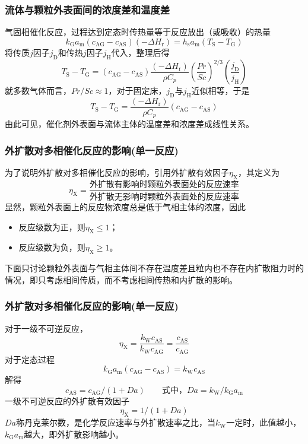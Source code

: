 \begin{frame}
    \frametitle{流体与颗粒外表面间的浓度差和温度差}

    气固相催化反应，过程达到定态时传热量等于反应放出（或吸收）的热量
    \[
        k_{\mathrm{G}} a_{\mathrm{m}}(c_{\mathrm{AG}}-c_{\mathrm{AS}})(-\Delta H_{\mathrm{r}})=h_{\mathrm{s}} a_{\mathrm{m}}(T_{\mathrm{S}}-T_{\mathrm{G}})
    \]
    将传质$j$因子$j_\mathrm{D}$和传热$j$因子$j_\mathrm{H}$代入，整理后得
    \[
        T_{\mathrm{S}}-T_{\mathrm{G}}=(c_{\mathrm{AG}}-c_{\mathrm{AS}}) \frac{(-\Delta H_{\mathrm{r}})}{\rho {C}_p}\left(\frac{P r}{S c}\right)^{2 / 3}\left(\frac{j_{\mathrm{D}}}{j_{\mathrm{H}}}\right)
    \]
    就多数气体而言，${P r}/{S c} \approx 1$，对于固定床，$j_\mathrm{D}$与$j_\mathrm{H}$近似相等，于是
    \[
        T_{\mathrm{S}}-T_{\mathrm{G}}=\frac{(-\Delta H_{\mathrm{r}})}{\rho{C_p}}(c_{\mathrm{AG}}-c_{\mathrm{AS}})
    \]
    由此可见，催化剂外表面与流体主体的温度差和浓度差成线性关系。

\end{frame}


\begin{frame}
    \frametitle{外扩散对多相催化反应的影响(单一反应)}

    为了说明外扩散对多相催化反应的影响，引用外扩散有效因子$\eta_\mathrm{X} $，其定义为
    \[
        \eta_\mathrm{X} = \frac{\text{外扩散有影响时颗粒外表面处的反应速率}}{\text{外扩散无影响时颗粒外表面处的反应速率}}
    \]
    显然，颗粒外表面上的反应物浓度总是低于气相主体的浓度，因此
    \begin{itemize}
        \item 反应级数为正，则$\eta_\mathrm{X} \leqslant 1$；
        \item 反应级数为负，则$\eta_\mathrm{X} \geqslant 1$。
    \end{itemize}

    下面只讨论颗粒外表面与气相主体间不存在温度差且粒内也不存在内扩散阻力时的情况，即只考虑相间传质，而不考虑相间传热和内扩散的影响。

\end{frame}


\begin{frame}
    \frametitle{外扩散对多相催化反应的影响(单一反应)}

    对于一级不可逆反应，
    \[
        \eta_{\mathrm{X}}=\frac{k_{\mathrm{W}} c_{\mathrm{AS}}}{k_{\mathrm{W}} c_{\mathrm{AG}}}=\frac{c_{\mathrm{AS}}}{c_{\mathrm{AG}}} 
    \]
    对于定态过程
    \[
        k_{\mathrm{G}} a_{\mathrm{m}}(c_{\mathrm{AG}}-c_{\mathrm{AS}})=k_{\mathrm{W}} c_{\mathrm{AS}}
    \]
    解得
    \[
       c_{\mathrm{AS}}=c_{\mathrm{AG}} /(1+D a) \qquad \text{式中，} D a=k_{\mathrm{W}} / k_{\mathrm{G}} a_{\mathrm{m}}
    \]
    一级不可逆反应的外扩散有效因子
    \[
        \eta_{\mathrm{X}}=1 /(1+D a)
    \]
    $D a$称丹克莱尔数，是化学反应速率与外扩散速率之比，当$k_{\mathrm{W}}$一定时，此值越小，$k_{\mathrm{G}} a_{\mathrm{m}}$越大，即外扩散影响越小。

\end{frame}


